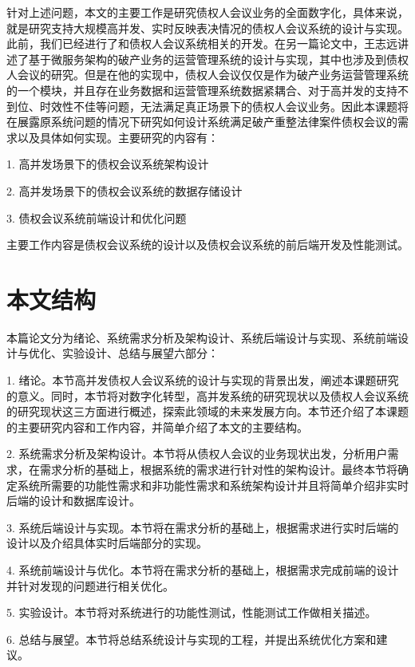 针对上述问题，本文的主要工作是研究债权人会议业务的全面数字化，具体来说，就是研究支持大规模高并发、实时反映表决情况的债权人会议系统的设计与实现。此前，我们已经进行了和债权人会议系统相关的开发。在另一篇论文中，王志远\cite{Wang2021}讲述了基于微服务架构的破产业务的运营管理系统的设计与实现，其中也涉及到债权人会议的研究。但是在他的实现中，债权人会议仅仅是作为破产业务运营管理系统的一个模块，并且存在业务数据和运营管理系统数据紧耦合、对于高并发的支持不到位、时效性不佳等问题，无法满足真正场景下的债权人会议业务。因此本课题将在展露原系统问题的情况下研究如何设计系统满足破产重整法律案件债权会议的需求以及具体如何实现。主要研究的内容有：

1. 高并发场景下的债权会议系统架构设计

2. 高并发场景下的债权会议系统的数据存储设计

3. 债权会议系统前端设计和优化问题

主要工作内容是债权会议系统的设计以及债权会议系统的前后端开发及性能测试。

\section{本文结构}
本篇论文分为绪论、系统需求分析及架构设计、系统后端设计与实现、系统前端设计与优化、实验设计、总结与展望六部分：

1. 绪论。本节高并发债权人会议系统的设计与实现的背景出发，阐述本课题研究的意义。同时，本节将对数字化转型，高并发系统的研究现状以及债权人会议系统的研究现状这三方面进行概述，探索此领域的未来发展方向。本节还介绍了本课题的主要研究内容和工作内容，并简单介绍了本文的主要结构。

2. 系统需求分析及架构设计。本节将从债权人会议的业务现状出发，分析用户需求，在需求分析的基础上，根据系统的需求进行针对性的架构设计。最终本节将确定系统所需要的功能性需求和非功能性需求和系统架构设计并且将简单介绍非实时后端的设计和数据库设计。

3. 系统后端设计与实现。本节将在需求分析的基础上，根据需求进行实时后端的设计以及介绍具体实时后端部分的实现。

4. 系统前端设计与优化。本节将在需求分析的基础上，根据需求完成前端的设计并针对发现的问题进行相关优化。

5. 实验设计。本节将对系统进行的功能性测试，性能测试工作做相关描述。

6. 总结与展望。本节将总结系统设计与实现的工程，并提出系统优化方案和建议。

